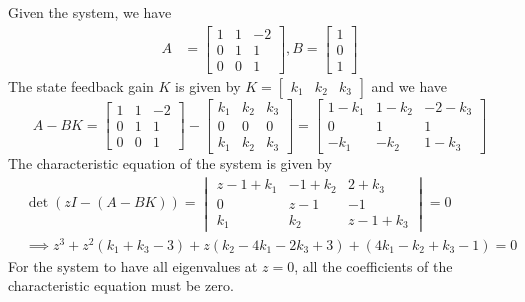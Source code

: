 Given the system, we have
\begin{align*}
    A
     & =
    \begin{bmatrix}
        1 & 1 & -2 \\
        0 & 1 & 1  \\
        0 & 0 & 1
    \end{bmatrix}
    ,
    B
    =
    \begin{bmatrix}
        1 \\
        0 \\
        1
    \end{bmatrix}
\end{align*}
The state feedback gain \( K \) is given by
\(
K =
\begin{bmatrix}
    k_1 & k_2 & k_3
\end{bmatrix}
\)
and we have
\begin{equation*}
    A - BK
    =
    \begin{bmatrix}
        1 & 1 & -2 \\
        0 & 1 & 1  \\
        0 & 0 & 1
    \end{bmatrix}
    -
    \begin{bmatrix}
        k_1 & k_2 & k_3 \\
        0   & 0   & 0   \\
        k_1 & k_2 & k_3
    \end{bmatrix}
    =
    \begin{bmatrix}
        1-k_1 & 1-k_2 & -2-k_3 \\
        0     & 1     & 1      \\
        -k_1  & -k_2  & 1-k_3
    \end{bmatrix}
\end{equation*}
The characteristic equation of the system is given by
\begin{align*}
     &
    \det(zI - (A - BK))
    =
    \begin{vmatrix}
        z - 1 + k_1 & -1 + k_2 & 2 + k_3     \\
        0           & z - 1    & -1          \\
        k_1         & k_2      & z - 1 + k_3
    \end{vmatrix}
    =
    0
    \\ &
    \implies
    z^3 + z^2 (k_1 + k_3 - 3) + z (k_2 - 4k_1 - 2k_3 + 3) + (4k_1 - k_2 + k_3 - 1) = 0
\end{align*}
For the system to have all eigenvalues at \( z = 0 \), all the coefficients of the characteristic equation must be zero.

